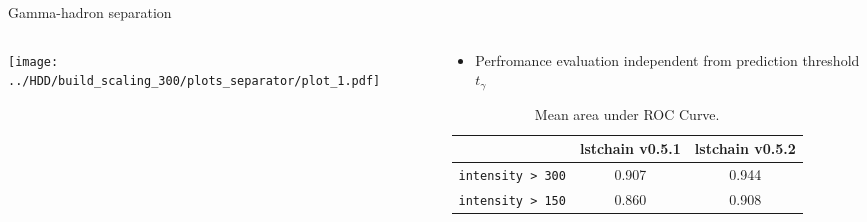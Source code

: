 \begin{frame}{Gamma-hadron separation}
    \begin{columns}[onlytextwidth]
        \begin{column}{0.5\textwidth}
            \centering
            \texttt{[image: ../HDD/build\_scaling\_300/plots\_separator/plot\_1.pdf]}
        \end{column}
        \begin{column}{0.5\textwidth}
            \begin{itemize}
                \item Perfromance evaluation independent from prediction threshold $t_\gamma$
            \end{itemize}
            \begin{table}
                \caption{Mean area under ROC Curve.}
                \begin{tabular}{ S  S  S}
                    \toprule
                     & {lstchain v0.5.1} & {lstchain v0.5.2} \\
                    \midrule
                    \texttt{intensity > 300} & 0.907 & 0.944 \\
                    \texttt{intensity > 150} & 0.860 & 0.908 \\
                    \bottomrule
                \end{tabular}
            \end{table}
        \end{column}
    \end{columns}

\end{frame}

